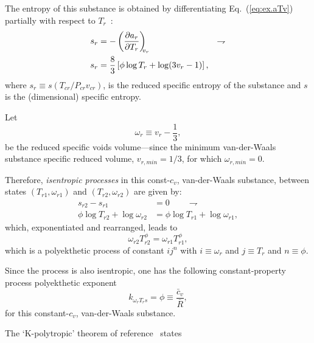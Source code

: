     The entropy of this substance is obtained by differentiating Eq.~(\ref{eq:ex.aTv}) partially
    with respect to $T_r$~\cite{1986-JonesJB+HawkinsGA-Wiley}:
    \begin{align}
        s_r & = -\left(\frac{\partial {{a_r}}}{\partial {{T_r}}}\right)_{\!\!\!{v_r}} & \rightharpoondown\\
        s_r & = \frac{8}{3}\left[\phi\log T_r + \log(3v_r - 1)\right], \label{eq:ex.sTv}
    \end{align}
    \noindent where $s_r \equiv s(T_{cr} / P_{cr}v_{cr})$, is the reduced  specific  entropy  of
    the substance and $s$ is the (dimensional) specific entropy.

    Let
    \begin{equation}
        \omega_r \equiv v_r - \frac{1}{3},
        \label{eq:def.omega}
    \end{equation}
    \noindent be the reduced specific voids volume---since the minimum  van-der-Waals  substance
    specific reduced volume, $v_{r,min} = 1/3$, for which $\omega_{r,min} = 0$.

    Therefore, \emph{isentropic processes} in this const-$c_v$, van-der-Waals substance, between
    states $(T_{r1}, \omega_{r1})$ and $(T_{r2}, \omega_{r2})$ are given by:
    \begin{align}
        s_{r2} - s_{r1} & = 0 \qquad\rightharpoondown\\
        \phi\log T_{r2} + \log\omega_{r2} & = \phi\log T_{r1} + \log\omega_{r1},
    \end{align}
    \noindent which, exponentiated and rearranged, leads to
    \begin{equation}
        \omega_{r2}T_{r2}^{\phi} = \omega_{r1}T_{r1}^{\phi},
        \label{eq:vdW.polyek}
    \end{equation}
    \noindent which is a polyekthetic process of constant $ij^n$ with $i \equiv \omega_r$ and $j
    \equiv T_r$ and $n \equiv \phi$.

    Since the process is also  isentropic,  one  has  the  following  constant-property  process
    polyekthetic exponent
    \begin{equation}
        k_{\omega_rT_rs} = \phi \equiv \frac{\bar{c}_v}{\bar{R}},
        \label{eq:vdW.kwTs}
    \end{equation}
    \noindent for this constant-$c_v$, van-der-Waals substance.

    The `K-polytropic' theorem of reference~\cite[p.~8]{2020-NaaktgeborenC-engrXiv} states

